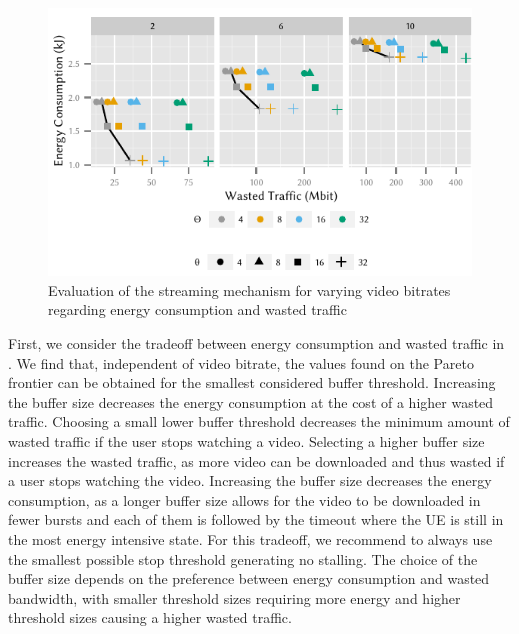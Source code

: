 \begin{figure}
  \centering
  \includegraphics{application/lte_video/trade_offs/figures/energy2lostData}
  \caption{Evaluation of the streaming mechanism for varying video bitrates regarding energy consumption and wasted traffic}
  \label{fig:application:lte_video:numerical_evaluation:trade_offs:energy2lostData}
\end{figure}


First, we consider the tradeoff between energy consumption and wasted traffic in .
We find that, independent of video bitrate, the values found on the Pareto frontier can be obtained for the smallest considered buffer threshold.
Increasing the buffer size decreases the energy consumption at the cost of a higher wasted traffic.
Choosing a small lower buffer threshold \bufferlower decreases the minimum amount of wasted traffic if the user stops watching a video.
Selecting a higher buffer size \buffersize  increases the wasted traffic, as more video can be downloaded and thus wasted if a user stops watching the video.
Increasing the buffer size \buffersize decreases the energy consumption, as a longer buffer size allows for the video to be downloaded in fewer bursts and each of them is followed by the \tidle timeout where the \gls{UE} is still in the most energy intensive \rrcconnected state.
For this tradeoff, we recommend to always use the smallest possible stop threshold generating no stalling.
The choice of the buffer size depends on the preference between energy consumption and wasted bandwidth, with smaller threshold sizes requiring more energy and higher threshold sizes causing a higher wasted traffic.


